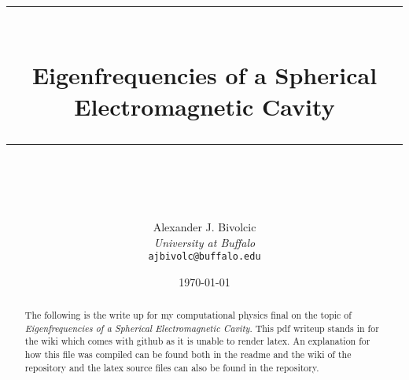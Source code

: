 \documentclass[letterpaper,12pt]{article}
\title{ \normalfont\normalsize
\textcolor{PineGreen}{\rule{\linewidth}{0.5pt}}\\
\vspace{17pt}
\textcolor{PineGreen}{{\huge Eigenfrequencies of a Spherical Electromagnetic Cavity}}\\
\vspace{9pt}
\textcolor{PineGreen}{\rule{\linewidth}{2pt}}\\
}
\author{
{\Large Alexander J. Bivolcic}\\ 
{\small \textit{University at Buffalo}}\\
{\small\texttt{ajbivolc@buffalo.edu}}
}
\date{\normalsize\today}
\begin{document}
\begin{titlepage}
\maketitle
\begin{abstract}
    The following is the write up for my computational physics final on the topic of \emph{Eigenfrequencies of a Spherical Electromagnetic Cavity}. This pdf writeup stands in for the wiki which comes with github as it is unable to render latex. An explanation for how this file was compiled can be found both in the readme and the wiki of the repository and the latex source files can also be found in the repository.
\end{abstract}
\thispagestyle{empty}
\end{titlepage}

\tableofcontents

\end{document}

